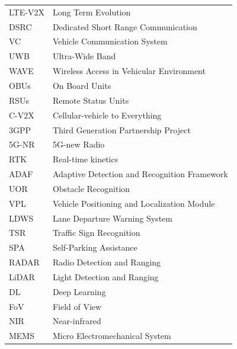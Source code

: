 \documentclass[a4paper,12pt]{article}
\begin{document}
\begin{center}
\begin{longtable}{|l|l|}
LTE-V2X & Long Term Evolution\\

DSRC & Dedicated Short Range Communication\\

VC & Vehicle Communication System \\

UWB & Ultra-Wide Band \\

WAVE & Wireless Access in Vehicular Environment  \\

OBUs & On Board Units \\

RSUs & Remote Status Units \\

C-V2X & Cellular-vehicle to Everything \\

3GPP & Third Generation Partnership Project \\

5G-NR & 5G-new Radio\\

RTK & Real-time kinetics\\

ADAF & Adaptive Detection and Recognition Framework\\

UOR & Obstacle Recognition\\

VPL & Vehicle Positioning and Localization Module\\

LDWS & Lane Departure Warning System\\

TSR & Traffic Sign Recognition\\

SPA & Self-Parking Assistance\\

RADAR & Radio Detection and Ranging\\

LiDAR & Light Detection and Ranging \\

DL & Deep Learning\\

FoV & Field of View \\

NIR & Near-infrared \\

MEMS & Micro Electromechanical System\\


\end{longtable}
\end{center}
\end{document}

